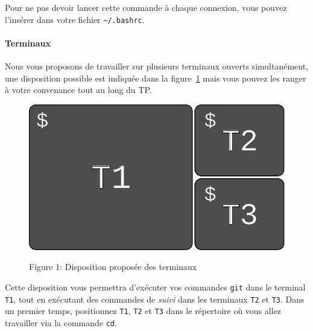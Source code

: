 \documentclass[final, a4paper, openbib, ]{article}
\newcommand{\WR}[1]{\textcolor{purple}{#1}}
\newcommand{\WR}[1]{{#1}}
\begin{document}
Pour ne pas devoir lancer cette commande à chaque connexion, vous pouvez l'insérer dans votre fichier \texttt{\~{}/.bashrc}.

%

\paragraph{Terminaux}
Nous vous proposons de travailler sur plusieurs terminaux ouverts simultanément, une disposition possible est indiquée dans la figure~\ref{terminals} mais vous pouvez les ranger à votre convenance tout au long du TP.
\begin{figure}[h]
	\centering
	{\includegraphics[scale=0.45]{images/terminals.pdf}}
	\caption{Figure 1: Disposition proposée des terminaux}
	\label{terminals}
\end{figure}

Cette disposition vous permettra d'exécuter vos commandes \texttt{git} dans le terminal \texttt{T1}, tout en exécutant des commandes de \textit{suivi} dans les terminaux \texttt{T2} et \texttt{T3}.
Dans un premier temps, positionnez \texttt{T1}, \texttt{T2} et \texttt{T3} dans le répertoire où vous allez travailler via la commande \texttt{cd}.\\
\end{document}
